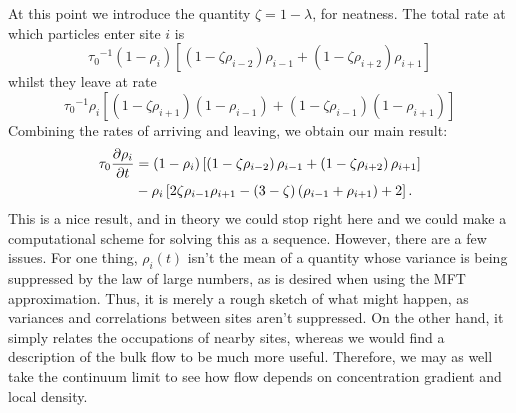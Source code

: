 At this point we introduce the quantity $\zeta = 1-\lambda$, for neatness.
The total rate at which particles enter site $i$ is
\begin{equation}
 {\tau_0}^{-1} \left(1-\rho_i \right) \left[ \left(1-\zeta \rho_{i-2} \right) \rho_{i-1} + \left(1-\zeta \rho_{i+2} \right) \rho_{i+1} \right]
\end{equation}
whilst they leave at rate
\begin{equation}
 {\tau_0}^{-1} \rho_i \left[ \left(1-\zeta \rho_{i+1} \right) \left(1 - \rho_{i-1} \right) + \left(1-\zeta \rho_{i-1} \right) \left(1 - \rho_{i+1} \right) \right]
\end{equation}
Combining the rates of arriving and leaving, we obtain our main result:
\begin{align}
\label{eq:latticeMFT}
\begin{split}
 \tau_0 \frac{\partial \rho_i}{\partial t} &= \left( 1-\rho_i \right) \left[ \left(1-\zeta\rho_{i-2} \right) \rho_{i-1} + \left(1-\zeta\rho_{i+2} \right) \rho_{i+1} \right] \\
 &- \rho_i \left[ 2 \zeta \rho_{i-1} \rho_{i+1}  - (3-\zeta)\left(\rho_{i-1} + \rho_{i+1}\right) + 2 \right].
 \end{split}
 \end{align}
This is a nice result, and in theory we could stop right here and we could make a computational scheme for solving this as a sequence. However, there are a few issues. For one thing, $\rho_i (t)$ isn't the mean of a quantity
whose variance is being suppressed by the law of large numbers, as is desired when using the MFT approximation.
Thus, it is merely a rough sketch of what might happen, as variances and correlations between sites aren't suppressed. On the other hand, it simply relates the occupations of nearby sites,
whereas we would find a description of the bulk flow to be much more useful. Therefore, we may as well take the continuum limit to see how flow depends on concentration gradient and local density.

